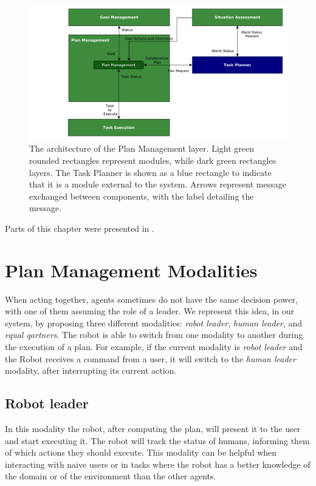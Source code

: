 \begin{figure}[ht!]
	\centering
	\includegraphics[scale=0.5]{img/coworker/plan_management/plan_management_architecture.pdf}
	\caption[The architecture of the Plan Production and Management layer]{The architecture of the Plan Management layer. Light green rounded rectangles represent modules, while dark green rectangles layers. The Task Planner is shown as a blue rectangle to indicate that it is a module external to the system. Arrows represent message exchanged between components, with the label detailing the message.}
	\label{fig:plan_management-architecture}
\end{figure}


Parts of this chapter were presented in \cite{Lallement2014,fioreiser2014}.

\section{Plan Management Modalities}
\label{sec:plan_management-modalities}
When acting together, agents sometimes do not have the same decision power, with one of them assuming the role of a leader. We represent this idea, in our system, by proposing three different modalities: \textit{robot leader}, \textit{human leader}, and \textit{equal qartners}. The robot is able to switch from one modality to another during the execution of a plan. For example, if the current modality is \textit{robot leader} and the Robot receives a command from a user, it will switch to the \textit{human leader} modality, after interrupting its current action.

\subsection{Robot leader}
In this modality the robot, after computing the plan, will present it to the user and start executing it. The robot will track the status of humans, informing them of which actions they should execute. This modality can be helpful when interacting with  naive users or in tasks where the robot has a better knowledge of the  domain or of the environment than the other agents.

